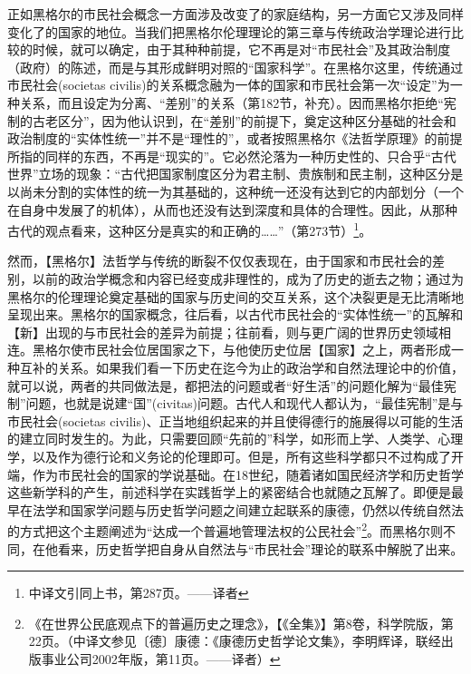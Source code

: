 正如黑格尔的市民社会概念一方面涉及改变了的家庭结构，另一方面它又涉及同样变化了的国家的地位。当我们把黑格尔伦理理论的第三章与传统政治学理论进行比较的时候，就可以确定，由于其种种前提，它不再是对“市民社会”及其政治制度（政府）的陈述，而是与其形成鲜明对照的“国家科学”。在黑格尔这里，传统通过市民社会(societas civilis)的关系概念融为一体的国家和市民社会第一次“设定”为一种关系，而且设定为分离、“差别”的关系（第182节，补充）。因而黑格尔拒绝“宪制的古老区分”，因为他认识到，在“差别”的前提下，奠定这种区分基础的社会和政治制度的“实体性统一”并不是“理性的”，或者按照黑格尔《法哲学原理》的前提所指的同样的东西，不再是“现实的”。它必然沦落为一种历史性的、只合乎“古代世界”立场的现象：“古代把国家制度区分为君主制、贵族制和民主制，这种区分是以尚未分割的实体性的统一为其基础的，这种统一还没有达到它的内部划分（一个在自身中发展了的机体），从而也还没有达到深度和具体的合理性。因此，从那种古代的观点看来，这种区分是真实的和正确的……”（第273节）\footnote{中译文引同上书，第287页。——译者}。

然而，【黑格尔】法哲学与传统的断裂不仅仅表现在，由于国家和市民社会的差别，以前的政治学概念和内容已经变成非理性的，成为了历史的逝去之物；通过为黑格尔的伦理理论奠定基础的国家与历史间的交互关系，这个决裂更是无比清晰地呈现出来。黑格尔的国家概念，往后看，以古代市民社会的“实体性统一”的瓦解和【新】出现的与市民社会的差异为前提；往前看，则与更广阔的世界历史领域相连。黑格尔使市民社会位居国家之下，与他使历史位居【国家】之上，两者形成一种互补的关系。如果我们看一下历史在迄今为止的政治学和自然法理论中的价值，就可以说，两者的共同做法是，都把法的问题或者“好生活”的问题化解为“最佳宪制”问题，也就是说建“国”(civitas)问题。古代人和现代人都认为，“最佳宪制”是与市民社会(societas civilis)、正当地组织起来的并且使得德行的施展得以可能的生活的建立同时发生的。为此，只需要回顾“先前的”科学，如形而上学、人类学、心理学，以及作为德行论和义务论的伦理即可。但是，所有这些科学都只不过构成了开端，作为市民社会的国家的学说基础。在18世纪，随着诸如国民经济学和历史哲学这些新学科的产生，前述科学在实践哲学上的紧密结合也就随之瓦解了。即便是最早在法学和国家学问题与历史哲学问题之间建立起联系的康德，仍然以传统自然法的方式把这个主题阐述为“达成一个普遍地管理法权的公民社会”\footnote{《在世界公民底观点下的普遍历史之理念》，【《全集》】第8卷，科学院版，第22页。（中译文参见〔德〕康德：《康德历史哲学论文集》，李明辉译，联经出版事业公司2002年版，第11页。——译者）}。而黑格尔则不同，在他看来，历史哲学把自身从自然法与“市民社会”理论的联系中解脱了出来。

